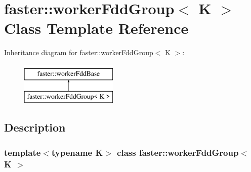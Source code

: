 \hypertarget{classfaster_1_1workerFddGroup}{}\section{faster\+:\+:worker\+Fdd\+Group$<$ K $>$ Class Template Reference}
\label{classfaster_1_1workerFddGroup}
Inheritance diagram for faster\+:\+:worker\+Fdd\+Group$<$ K $>$\+:\begin{figure}[H]
\begin{center}
\leavevmode
\includegraphics[height=2.000000cm]{classfaster_1_1workerFddGroup}
\end{center}
\end{figure}


\subsection{Description}
\subsubsection*{template$<$typename K$>$\newline
class faster\+::worker\+Fdd\+Group$<$ K $>$}

